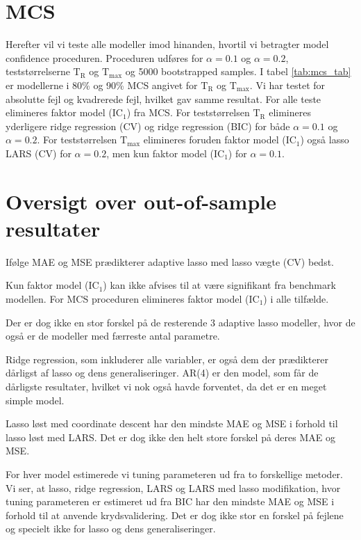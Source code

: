 \section{MCS} 
Herefter vil vi teste alle modeller imod hinanden, hvortil vi betragter model confidence proceduren.
Proceduren udføres for \(\alpha = 0.1\) og \(\alpha = 0.2\), teststørrelserne \(\text{T}_\text{R}\) og \(\text{T}_\text{max}\) og 5000 bootstrapped samples.
I tabel \ref{tab:mcs_tab} er modellerne i 80\% og 90\% MCS angivet for \(\text{T}_\text{R}\) og \(\text{T}_\text{max}\).
Vi har testet for absolutte fejl og kvadrerede fejl, hvilket gav samme resultat.
For alle teste elimineres faktor model (IC\(_1\)) fra MCS.
For teststørrelsen \(\text{T}_\text{R}\) elimineres yderligere ridge regression (CV) og ridge regression (BIC) for både \(\alpha = 0.1\) og \(\alpha = 0.2\).
For teststørrelsen \(\text{T}_\text{max}\) elimineres foruden faktor model (IC\(_1\)) også lasso LARS (CV) for \(\alpha = 0.2\), men kun faktor model (IC\(_1\)) for \(\alpha = 0.1\).
%

%

\section{Oversigt over out-of-sample resultater}
Ifølge MAE og MSE prædikterer adaptive lasso med lasso vægte (CV) bedst.

Kun faktor model (IC\(_1\)) kan ikke afvises til at være signifikant fra benchmark modellen.
For MCS proceduren elimineres faktor model (IC\(_1\)) i alle tilfælde.

Der er dog ikke en stor forskel på de resterende 3 adaptive lasso modeller, hvor de også er de modeller med færreste antal parametre. 

Ridge regression, som inkluderer alle variabler, er også dem der prædikterer dårligst af lasso og dens generaliseringer. 
AR(4) er den model, som får de dårligste resultater, hvilket vi nok også havde forventet, da det er en meget simple model. 

Lasso løst med coordinate descent har den mindste MAE og MSE i forhold til lasso løst med LARS. Det er dog ikke den helt store forskel på deres MAE og MSE. 

For hver model estimerede vi tuning parameteren ud fra to forskellige metoder. Vi ser, at lasso, ridge regression, LARS og LARS med lasso modifikation, hvor tuning parameteren er estimeret ud fra BIC har den mindste MAE og MSE i forhold til at anvende krydsvalidering. Det er dog ikke stor en forskel på fejlene og specielt ikke for lasso og dens generaliseringer. 

%
%


